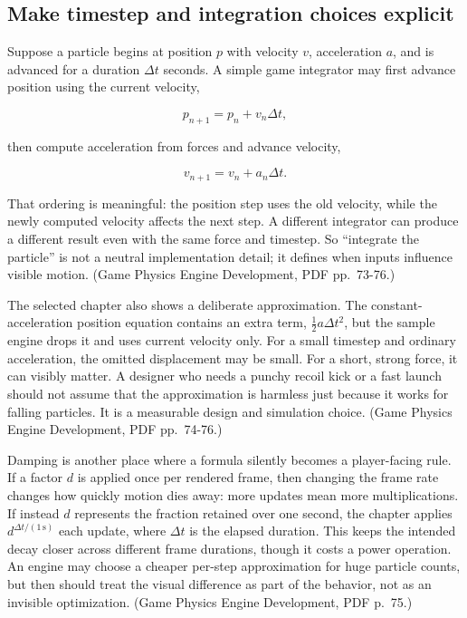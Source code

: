 \subsection{Make timestep and integration choices explicit}\label{05-engine-i-ch014-make-timestep-and-integration-choices-explicit}

\hypertarget{05-engine-i-ch014-make-timestep-and-integration-choices-explicit}{}

Suppose a particle begins at position \(p\) with velocity \(v\), acceleration \(a\), and is advanced for a duration \(\Delta t\) seconds. A simple game integrator may first advance position using the current velocity,

\[p_{n+1}=p_n+v_n\Delta t,\]

then compute acceleration from forces and advance velocity,

\[v_{n+1}=v_n+a_n\Delta t.\]

That ordering is meaningful: the position step uses the old velocity, while the newly computed velocity affects the next step. A different integrator can produce a different result even with the same force and timestep. So ``integrate the particle'' is not a neutral implementation detail; it defines when inputs influence visible motion. (Game Physics Engine Development, PDF pp.~73-76.)

The selected chapter also shows a deliberate approximation. The constant-acceleration position equation contains an extra term, \(\frac{1}{2}a\Delta t^2\), but the sample engine drops it and uses current velocity only. For a small timestep and ordinary acceleration, the omitted displacement may be small. For a short, strong force, it can visibly matter. A designer who needs a punchy recoil kick or a fast launch should not assume that the approximation is harmless just because it works for falling particles. It is a measurable design and simulation choice. (Game Physics Engine Development, PDF pp.~74-76.)

Damping is another place where a formula silently becomes a player-facing rule. If a factor \(d\) is applied once per rendered frame, then changing the frame rate changes how quickly motion dies away: more updates mean more multiplications. If instead \(d\) represents the fraction retained over one second, the chapter applies \(d^{\Delta t/(1\,\mathrm{s})}\) each update, where \(\Delta t\) is the elapsed duration. This keeps the intended decay closer across different frame durations, though it costs a power operation. An engine may choose a cheaper per-step approximation for huge particle counts, but then should treat the visual difference as part of the behavior, not as an invisible optimization. (Game Physics Engine Development, PDF p.~75.)

